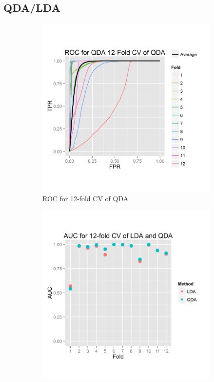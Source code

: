 \documentclass{article}\usepackage[]{graphicx}\usepackage[]{color}
\begin{document}
\subsection{QDA/LDA}

\begin{figure}[h]
  \centering 
  \begin{subfigure}[b]{0.3\textwidth}
    \includegraphics[width=\linewidth]{ROC_12_folds_DA.png}
    \caption{ROC for 12-fold CV of QDA}
    \label{12-foldROC}
  \end{subfigure}  
  \begin{subfigure}[b]{0.3\textwidth}
    \includegraphics[width=\linewidth]{AUC_12_folds_DA.png}

\end{subfigure}
\end{figure}
\end{document}
